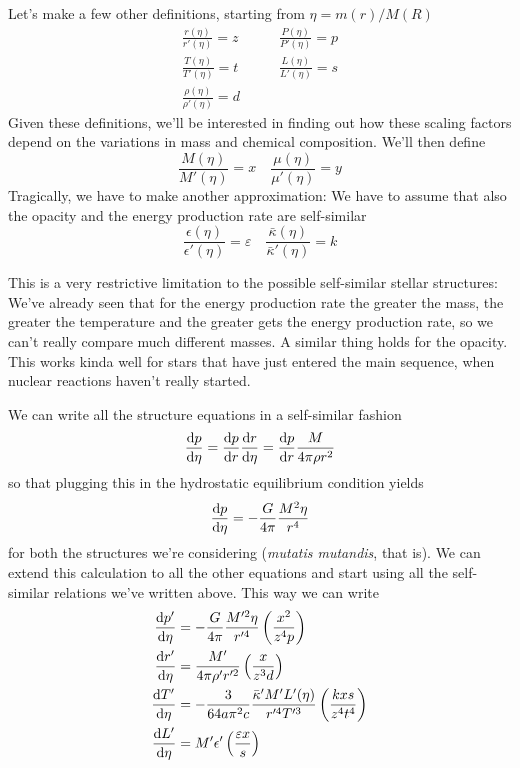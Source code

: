 \par Let's make a few other definitions, starting from $\eta = m(r)/M(R)$
\begin{align*}
	\frac{r(\eta)}{r'(\eta)} = z \quad & \quad \frac{P(\eta)}{P'(\eta)} = p \\
	\frac{T(\eta)}{T'(\eta)} = t \quad & \quad \frac{L(\eta)}{L'(\eta)} = s \\
	\frac{\rho(\eta)}{\rho'(\eta)} = d \quad & \quad
\end{align*}
Given these definitions, we'll be interested in finding out how these scaling factors depend on the variations in mass and chemical composition. We'll then define
\begin{equation*}
	\frac{M(\eta)}{M'(\eta)} = x \quad \frac{\mu(\eta)}{\mu'(\eta)} = y
\end{equation*}
Tragically, we have to make another approximation: We have to assume that also the opacity and the energy production rate are self-similar
\begin{equation*}
	\frac{\epsilon(\eta)}{\epsilon'(\eta)} = \varepsilon \quad \frac{\bar{\kappa}(\eta)}{\bar{\kappa}'(\eta)} = k
\end{equation*}
\par This is a very restrictive limitation to the possible self-similar stellar structures: We've already seen that for the energy production rate the greater the mass, the greater the temperature and the greater gets the energy production rate, so we can't really compare much different masses. A similar thing holds for the opacity. This works kinda well for stars that have just entered the main sequence, when nuclear reactions haven't really started.
\par We can write all the structure equations in a self-similar fashion
\begin{equation*}
	\frac{\text{d}p}{\text{d}\eta} = \frac{\text{d}p}{\text{d}r}\frac{\text{d}r}{\text{d}\eta} = \frac{\text{d}p}{\text{d}r}\frac{M}{4\pi\rho r^{2}}
\end{equation*}
so that plugging this in the hydrostatic equilibrium condition yields
\begin{equation*}
	\frac{\text{d}p}{\text{d}\eta} = -\frac{G}{4\pi}\frac{M^{2}\eta}{r^{4}}
\end{equation*}
for both the structures we're considering (\emph{mutatis mutandis}, that is). We can extend this calculation to all the other equations and start using all the self-similar relations we've written above. This way we can write
\begin{align*}
	\frac{\text{d}p'}{\text{d}\eta} &= -\frac{G}{4\pi}\frac{M'^{2}\eta}{r'^{4}}\left(\frac{x^{2}}{z^{4}p}\right) \\
	\frac{\text{d}r'}{\text{d}\eta} &= \frac{M'}{4\pi\rho'r'^{2}}\left(\frac{x}{z^{3}d}\right)\\
	\frac{\text{d}T'}{\text{d}\eta} &= -\frac{3}{64a\pi^{2}c}\frac{\bar{\kappa}'M'L'(\eta)}{r'^{4}T'^{3}}\left(\frac{kxs}{z^{4}t^{4}}\right)\\
	\frac{\text{d}L'}{\text{d}\eta} &= M'\epsilon'\left(\frac{\varepsilon x}{s}\right)
\end{align*}
